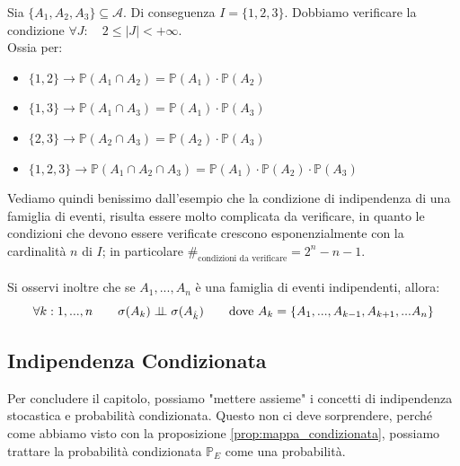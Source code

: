 \begin{esempio}
    Sia $\{A_1, A_2, A_3\}\subseteq\mathcal{A}$. Di conseguenza $I = \{1, 2, 3\}$. Dobbiamo verificare la condizione $\forall J:\quad 2\leq |J| < +\infty$. \\
    Ossia per:
    \begin{itemize}
        \item $\{1, 2\}\longrightarrow \mathbb{P}(A_1\cap A_2)=\mathbb{P}(A_1)\cdot \mathbb{P}(A_2)$
        \item $\{1, 3\}\longrightarrow \mathbb{P}(A_1\cap A_3)=\mathbb{P}(A_1)\cdot \mathbb{P}(A_3)$
        \item $\{2, 3\}\longrightarrow \mathbb{P}(A_2\cap A_3)=\mathbb{P}(A_2)\cdot \mathbb{P}(A_3)$
        \item $\{1, 2, 3\}\longrightarrow \mathbb{P}(A_1\cap A_2\cap A_3)=\mathbb{P}(A_1)\cdot \mathbb{P}(A_2)\cdot \mathbb{P}(A_3)$
    \end{itemize}
\end{esempio}
Vediamo quindi benissimo dall'esempio che la condizione di indipendenza di una famiglia di eventi, risulta essere molto complicata da verificare, in quanto le condizioni che devono essere verificate crescono esponenzialmente con la cardinalità $n$ di $I$; in particolare $\#_{\text{condizioni da verificare}} = 2^n - n - 1$.\\
\\
Si osservi inoltre che se $A_1, ..., A_n$ è una famiglia di eventi indipendenti, allora:
\[\forall k:1, ..., n\qquad \sigma(A_k)\mathrel{\perp\!\!\!\perp} \sigma(A_{\hat{k}})\qquad \text{dove } A_k=\{A_1, ..., A_{k-1}, A_{k+1}, ...A_n\}\]

\subsection{Indipendenza Condizionata}
Per concludere il capitolo, possiamo "mettere assieme" i concetti di indipendenza stocastica e probabilità condizionata. Questo non ci deve sorprendere, perché come abbiamo visto con la proposizione \eqref{prop:mappa_condizionata}, possiamo trattare la probabilità condizionata $\mathbb{P}_E$ come una probabilità.

